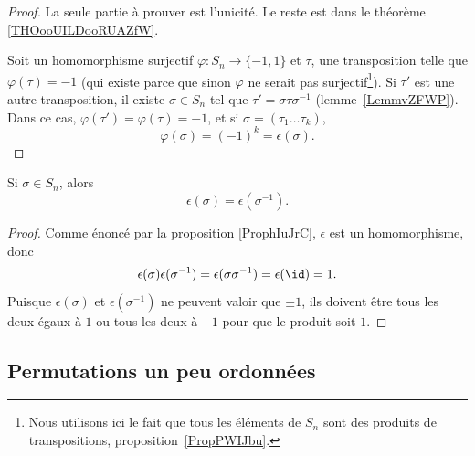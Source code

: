 \begin{proof}
	La seule partie à prouver est l'unicité. Le reste est dans le théorème \ref{THOooUILDooRUAZfW}.

	Soit un homomorphisme surjectif \( \varphi\colon S_n\to \{ -1,1 \}\) et \( \tau\), une transposition telle que \( \varphi(\tau)=-1\) (qui existe parce que sinon \( \varphi\) ne serait pas surjectif\footnote{Nous utilisons ici le fait que tous les éléments de \( S_n\) sont des produits de transpositions, proposition~\ref{PropPWIJbu}.}). Si \( \tau'\) est une autre transposition, il existe \( \sigma\in S_n\) tel que \( \tau'=\sigma\tau\sigma^{-1}\) (lemme~\ref{LemmvZFWP}). Dans ce cas, \( \varphi(\tau')=\varphi(\tau)=-1\), et si \( \sigma=(\tau_1\ldots \tau_k) \),
	\begin{equation}
		\varphi(\sigma)=(-1)^k=\epsilon(\sigma).
	\end{equation}
\end{proof}

\begin{corollary}       \label{CORooZLUKooBOhUPG}
	Si \( \sigma\in S_n\), alors
	\begin{equation}
		\epsilon(\sigma)=\epsilon(\sigma^{-1}).
	\end{equation}
\end{corollary}

\begin{proof}
	Comme énoncé par la proposition \ref{ProphIuJrC}, \( \epsilon\) est un homomorphisme, donc
	\begin{equation}
		\epsilon(\sigma)\epsilon(\sigma^{-1})=\epsilon(\sigma\sigma^{-1})=\epsilon(\id)=1.
	\end{equation}
	Puisque \( \epsilon(\sigma)\) et \( \epsilon(\sigma^{-1})\) ne peuvent valoir que \( \pm1\), ils doivent être tous les deux égaux à \( 1\) ou tous les deux à \( -1\) pour que le produit soit \( 1\).
\end{proof}

\subsection{Permutations un peu ordonnées}

